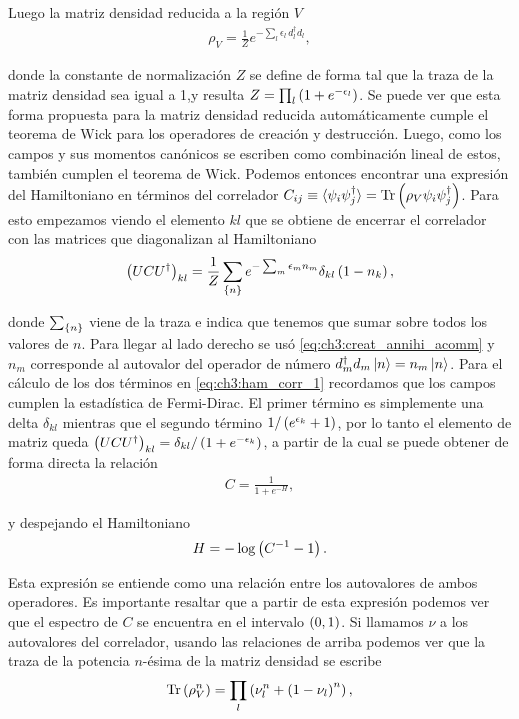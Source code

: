\documentclass[../main.tex]{subfiles}
\begin{document}
Luego la matriz densidad reducida a la región $V$
\begin{align}
	\rho_V = \frac 1Z e^{-\sum_l \epsilon_l\, d_l^\dagger d_l},
\end{align}

\noindent donde la constante de normalización $Z$ se define de forma tal que la traza de la matriz densidad sea igual a 1,y resulta $Z = \prod_l \left ( 1 + e^{-\epsilon_l} \right )$. Se puede ver que esta forma propuesta para la matriz densidad reducida automáticamente cumple el teorema de Wick para los operadores de creación y destrucción. Luego, como los campos y sus momentos canónicos se escriben como combinación lineal de estos, también cumplen el teorema de Wick. Podemos entonces encontrar una expresión del Hamiltoniano en términos del correlador $C_{ij} \equiv \langle \psi_i \psi_j^\dagger \rangle = \text{Tr}\left ( \rho_V \psi_i \psi_j^\dagger \right )$. Para esto empezamos viendo el elemento $kl$ que se obtiene de encerrar el correlador con las matrices que diagonalizan al Hamiltoniano
\begin{align}
	\label{eq:ch3:ham_corr_1}
	\left ( U C U^\dagger \right )_{kl} = \frac 1Z \sum_{\left \{ n \right \}} e^{- \sum_m \epsilon_m n_m} \delta_{k l} \left ( 1 - n_k \right ),
\end{align}

\noindent donde $\sum_{\left \{ n \right \}}$ viene de la traza e indica que tenemos que sumar sobre todos los valores de $n$. Para llegar al lado derecho se usó \eqref{eq:ch3:creat_annihi_acomm} y $n_m$ corresponde al autovalor del operador de número $d_m^\dagger d_m \left | n \right \rangle = n_m \left | n \right \rangle$. Para el cálculo de los dos términos en \eqref{eq:ch3:ham_corr_1} recordamos que los campos cumplen la estadística de Fermi-Dirac. El primer término es simplemente una delta $\delta_{kl}$ mientras que el segundo término $1/\left ( e^{\epsilon_k} + 1 \right )$, por lo tanto el elemento de matriz queda $\left ( U C U^\dagger \right )_{kl} = \delta_{kl}/\left ( 1 + e^{-\epsilon_k} \right )$, a partir de la cual se puede obtener de forma directa la relación
\begin{align}
	C = \frac 1{1 + e^{-H}},
\end{align}

\noindent y despejando el Hamiltoniano
\begin{align}
	H = - \log\left ( C^{-1} - 1 \right ).
\end{align}

Esta expresión se entiende como una relación entre los autovalores de ambos operadores. Es importante resaltar que a partir de esta expresión podemos ver que el espectro de $C$ se encuentra en el intervalo $\left ( 0, 1 \right )$. Si llamamos $\nu$ a los autovalores del correlador, usando las relaciones de arriba podemos ver que la traza de la potencia $n$-ésima de la matriz densidad se escribe
\begin{align}
	\text{Tr}\left ( \rho_V^n \right ) = \prod_l\left ( \nu_l^n + \left ( 1 - \nu_l \right )^n \right ),
\end{align}
\end{document}
